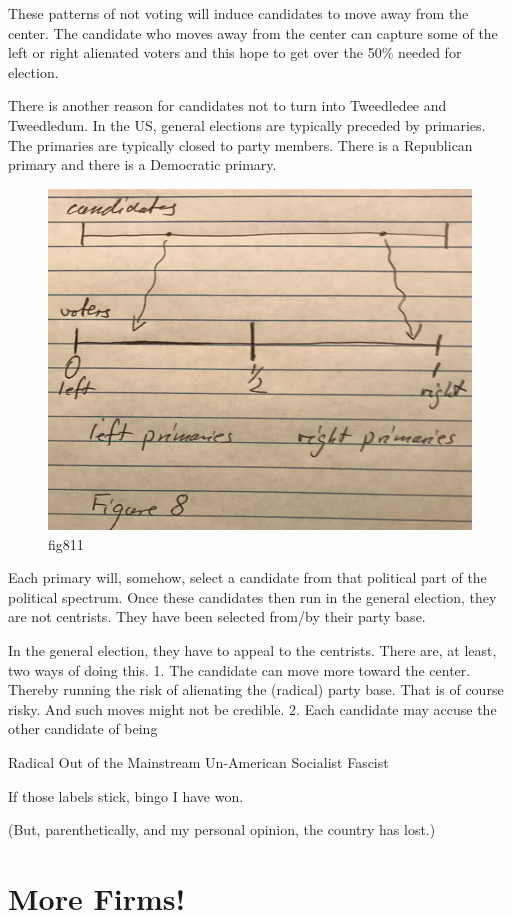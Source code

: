 \documentclass[
]{book}
\begin{document}
These patterns of not voting will induce candidates to move away from the center. The candidate who moves away from the center can capture some of the left or right alienated voters and this hope to get over the 50\% needed for election.

There is another reason for candidates not to turn into Tweedledee and Tweedledum. In the US, general elections are typically preceded by primaries. The primaries are typically closed to party members. There is a Republican primary and there is a Democratic primary.

\begin{figure}

{\centering \includegraphics[width=0.5\linewidth]{img/ch8/fig11} 

}

\caption{fig811}\label{fig:fig811}
\end{figure}

Each primary will, somehow, select a candidate from that political part of the political spectrum. Once these candidates then run in the general election, they are not centrists. They have been selected from/by their party base.

In the general election, they have to appeal to the centrists. There are, at least, two ways of doing this.
1. The candidate can move more toward the center. Thereby running the risk of alienating the (radical) party base. That is of course risky. And such moves might not be credible.
2. Each candidate may accuse the other candidate of being

\begin{center}
Radical
Out of the Mainstream
Un-American
Socialist
Fascist

\end{center}

If those labels stick, bingo I have won.

(But, parenthetically, and my personal opinion, the country has lost.)

\hypertarget{more-firms}{%
\section{More Firms!}\label{more-firms}}
\end{document}
